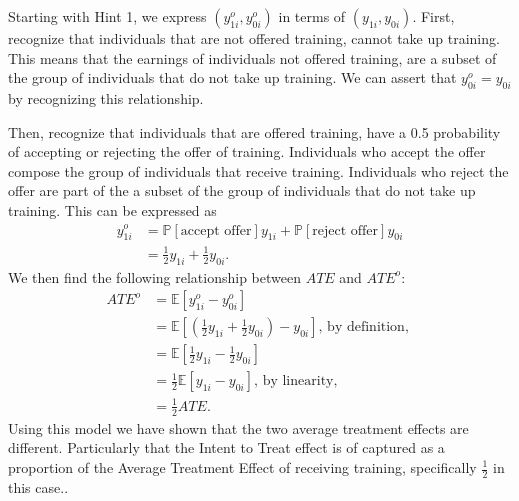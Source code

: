 \documentclass[
]{article}
\begin{document}
Starting with Hint 1, we express \((y_{1i}^o, y_{0i}^o)\) in terms of
\((y_{1i}, y_{0i})\). First, recognize that individuals that are not
offered training, cannot take up training. This means that the earnings
of individuals not offered training, are a subset of the group of
individuals that do not take up training. We can assert that
\(y_{0i}^o = y_{0i}\) by recognizing this relationship.

\par\medskip

Then, recognize that individuals that are offered training, have a 0.5
probability of accepting or rejecting the offer of training. Individuals
who accept the offer compose the group of individuals that receive
training. Individuals who reject the offer are part of the a subset of
the group of individuals that do not take up training. This can be
expressed as \begin{align*}
    y_{1i}^o &= \mathbb{P}[\text{accept offer}]y_{1i} + \mathbb{P}[\text{reject offer}]y_{0i}\\ 
    &= \frac{1}{2}y_{1i} + \frac{1}{2}y_{0i}.
\end{align*} We then find the following relationship between \(ATE\) and
\(ATE^o\): \begin{align*}
    ATE^o &= \mathbb{E}[y_{1i}^o - y_{0i}^o]\\
    &= \mathbb{E}[(\frac{1}{2}y_{1i} + \frac{1}{2}y_{0i}) - y_{0i}] \text{, by definition, }\\
    &= \mathbb{E}[\frac{1}{2}y_{1i} - \frac{1}{2}y_{0i}]\\
    &= \frac{1}{2}\mathbb{E}[y_{1i} - y_{0i}] \text{, by linearity, }\\
    &= \frac{1}{2}ATE.
\end{align*} Using this model we have shown that the two average
treatment effects are different. Particularly that the Intent to Treat
effect is of captured as a proportion of the Average Treatment Effect of
receiving training, specifically \(\frac{1}{2}\) in this case..
\end{document}
